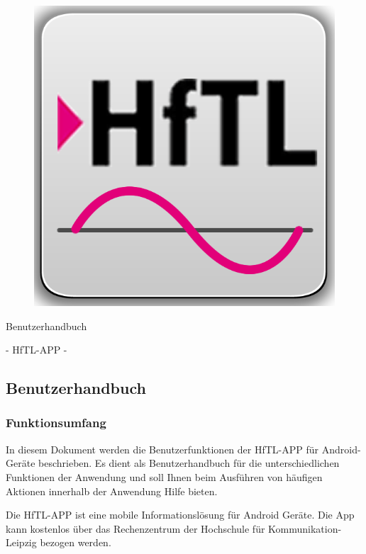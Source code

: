 \begin{figure}[h]
	\centering
	\includegraphics[scale=2.5]{03_Bedienungsanleitung/img/Logo_HFTl_App.png}
	\label{img:grafik-dummy}
\end{figure}

\begin{center}
	{\huge Benutzerhandbuch}
\end{center}

\begin{center}
	{\huge -  HfTL-APP  -}
\end{center}



\newpage
\subsection{Benutzerhandbuch}
\subsubsection{Funktionsumfang}
In diesem Dokument werden die Benutzerfunktionen der HfTL-APP für
Android-Geräte beschrieben. Es dient als Benutzerhandbuch für die
unterschiedlichen Funktionen der Anwendung und soll Ihnen beim
Ausführen von häufigen Aktionen innerhalb der Anwendung Hilfe bieten.

Die HfTL-APP ist eine mobile Informationslösung für Android Geräte. Die App kann kostenlos über das Rechenzentrum der Hochschule für Kommunikation-Leipzig bezogen werden.


